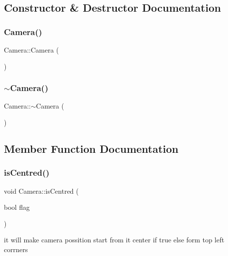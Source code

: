 \subsection{Constructor \& Destructor Documentation}
\mbox{\label{classsc_1_1_camera_a01f94c3543f56ede7af49dc778f19331}} 
\subsubsection{\texorpdfstring{Camera()}{Camera()}}
{\footnotesize\ttfamily Camera\+::\+Camera (\begin{DoxyParamCaption}{ }\end{DoxyParamCaption})}

\mbox{\label{classsc_1_1_camera_ad1897942d0ccf91052386388a497349f}} 
\subsubsection{\texorpdfstring{$\sim$Camera()}{~Camera()}}
{\footnotesize\ttfamily Camera\+::$\sim$\+Camera (\begin{DoxyParamCaption}{ }\end{DoxyParamCaption})}



\subsection{Member Function Documentation}
\mbox{\label{classsc_1_1_camera_a11435e666d8d36637823263b1d494ffb}} 
\subsubsection{\texorpdfstring{isCentred()}{isCentred()}}
{\footnotesize\ttfamily void Camera\+::is\+Centred (\begin{DoxyParamCaption}\item[{bool}]{flag }\end{DoxyParamCaption})}



it will make camera possition start from it center if true else form top left corrners 

